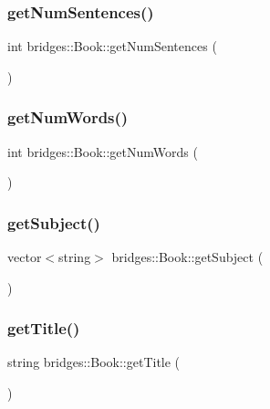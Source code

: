 \subsubsection{\texorpdfstring{get\+Num\+Sentences()}{getNumSentences()}}
{\footnotesize\ttfamily int bridges\+::\+Book\+::get\+Num\+Sentences (\begin{DoxyParamCaption}{ }\end{DoxyParamCaption})\hspace{0.3cm}{\ttfamily [inline]}}

\mbox{\label{classbridges_1_1_book_af3810d4dab23944d6cb83f6fb3a627d7}} 
\subsubsection{\texorpdfstring{get\+Num\+Words()}{getNumWords()}}
{\footnotesize\ttfamily int bridges\+::\+Book\+::get\+Num\+Words (\begin{DoxyParamCaption}{ }\end{DoxyParamCaption})\hspace{0.3cm}{\ttfamily [inline]}}

\mbox{\label{classbridges_1_1_book_aea7da4cd608fbccf1742f64913a314c0}} 
\subsubsection{\texorpdfstring{get\+Subject()}{getSubject()}}
{\footnotesize\ttfamily vector$<$string$>$ bridges\+::\+Book\+::get\+Subject (\begin{DoxyParamCaption}{ }\end{DoxyParamCaption})\hspace{0.3cm}{\ttfamily [inline]}}

\mbox{\label{classbridges_1_1_book_ab69bb95904587455af97c6fd6299bc1d}} 
\subsubsection{\texorpdfstring{get\+Title()}{getTitle()}}
{\footnotesize\ttfamily string bridges\+::\+Book\+::get\+Title (\begin{DoxyParamCaption}{ }\end{DoxyParamCaption})\hspace{0.3cm}{\ttfamily [inline]}}


